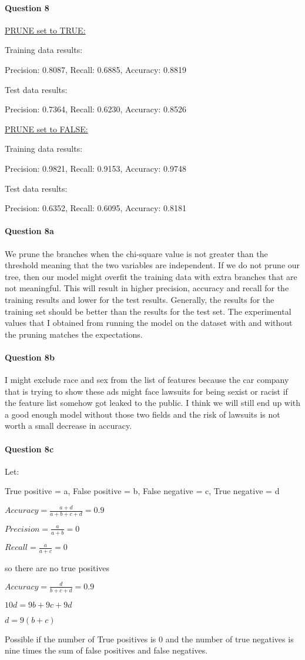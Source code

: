\documentclass[12pt]{article}
\newcommand{\myparagraph}[1]{\paragraph{#1}\mbox{}}
\begin{document}
\thispagestyle{fancy}

\myparagraph{Question 8}

\underline{PRUNE set to TRUE:}

Training data results:

Precision: 0.8087, Recall: 0.6885, Accuracy: 0.8819

Test data results:

Precision: 0.7364, Recall: 0.6230, Accuracy: 0.8526

\underline{PRUNE set to FALSE:}

Training data results:

Precision: 0.9821, Recall: 0.9153, Accuracy: 0.9748

Test data results:

Precision: 0.6352, Recall: 0.6095, Accuracy: 0.8181




\myparagraph{Question 8a}

We prune the branches when the chi-square value is not greater than the threshold meaning that the two variables are independent. If we do not prune our tree, then our model might overfit the training data with extra branches that are not meaningful. This will result in higher precision, accuracy and recall for the training results and lower for the test results. Generally, the results for the training set should be better than the results for the test set. The experimental values that I obtained from running the model on the dataset with and without the pruning matches the expectations.

\myparagraph{Question 8b}
I might exclude race and sex from the list of features because the car company that is trying to show these ads might face lawsuits for being sexist or racist if the feature list somehow got leaked to the public. I think we will still end up with a good enough model without those two fields and the risk of lawsuits is not worth a small decrease in accuracy.

\myparagraph{Question 8c}

Let:

True positive = a, False positive = b, False negative = c, True negative = d

$Accuracy = \frac{a + d}{a + b + c + d} = 0.9$

$Precision = \frac{a}{a + b} = 0$

$Recall = \frac{a}{a + c} = 0$

so there are no true positives

$Accuracy = \frac{d}{b + c + d} = 0.9$

$10d = 9b + 9c + 9d$

$d = 9(b+c)$

Possible if the number of True positives is 0 and the number of true negatives is nine times the sum of false positives and false negatives.
\end{document}
